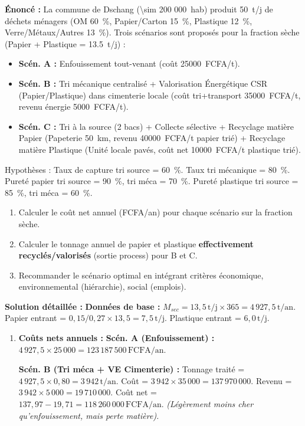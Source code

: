 \documentclass[11pt]{article}
\begin{document}
\begin{exoresolu}
\textbf{Énoncé :} La commune de Dschang (\SI{\sim 200 000}{hab}) produit \SI{50}{t/j} de déchets ménagers (OM \SI{60}{\%}, Papier/Carton \SI{15}{\%}, Plastique \SI{12}{\%}, Verre/Métaux/Autres \SI{13}{\%}). Trois scénarios sont proposés pour la fraction sèche (Papier + Plastique = \SI{13,5}{t/j}) :
\begin{itemize}
    \item \textbf{Scén. A :} Enfouissement tout-venant (coût \SI{25 000}{FCFA/t}).
    \item \textbf{Scén. B :} Tri mécanique centralisé + Valorisation Énergétique CSR (Papier/Plastique) dans cimenterie locale (coût tri+transport \SI{35 000}{FCFA/t}, revenu énergie \SI{5 000}{FCFA/t}).
    \item \textbf{Scén. C :} Tri à la source (2 bacs) + Collecte sélective + Recyclage matière Papier (Papeterie \SI{50}{km}, revenu \SI{40 000}{FCFA/t} papier trié) + Recyclage matière Plastique (Unité locale pavés, coût net \SI{10 000}{FCFA/t} plastique trié).
\end{itemize}
Hypothèses : Taux de capture tri source = \SI{60}{\%}. Taux tri mécanique = \SI{80}{\%}. Pureté papier tri source = \SI{90}{\%}, tri méca = \SI{70}{\%}. Pureté plastique tri source = \SI{85}{\%}, tri méca = \SI{60}{\%}.
\begin{enumerate}
    \item Calculer le coût net annuel (FCFA/an) pour chaque scénario sur la fraction sèche.
    \item Calculer le tonnage annuel de papier et plastique \textbf{effectivement recyclés/valorisés} (sortie process) pour B et C.
    \item Recommander le scénario optimal en intégrant critères économique, environnemental (hiérarchie), social (emplois).
\end{enumerate}
\tcblower
\textbf{Solution détaillée :}
\textbf{Données de base :} $M_{sec} = 13,5\,\text{t/j} \times 365 = 4\,927,5\,\text{t/an}$. Papier entrant = $0,15/0,27 \times 13,5 = 7,5\,\text{t/j}$. Plastique entrant = $6,0\,\text{t/j}$.

\begin{enumerate}
    \item \textbf{Coûts nets annuels :}
    \textbf{Scén. A (Enfouissement) :} $4\,927,5 \times 25\,000 = \boxed{123\,187\,500\,\text{FCFA/an}}$.
    
    \textbf{Scén. B (Tri méca + VE Cimenterie) :}
    Tonnage traité = $4\,927,5 \times 0,80 = 3\,942\,\text{t/an}$.
    Coût = $3\,942 \times 35\,000 = 137\,970\,000$.
    Revenu = $3\,942 \times 5\,000 = 19\,710\,000$.
    Coût net = $137,97 - 19,71 = \boxed{118\,260\,000\,\text{FCFA/an}}$.
    \textit{(Légèrement moins cher qu'enfouissement, mais perte matière).}
    

\end{enumerate}
\end{exoresolu}
\end{document}
